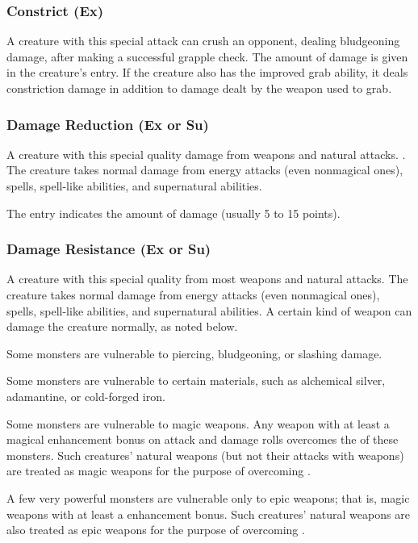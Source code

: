 \subsubsection{Constrict (Ex)} A creature with this special attack can crush an opponent, dealing bludgeoning damage, after making a successful grapple check. The amount of damage is given in the creature's entry. If the creature also has the improved grab ability, it deals constriction damage in addition to damage dealt by the weapon used to grab.

\subsubsection{Damage Reduction (Ex or Su)} A creature with this special quality  damage from weapons and natural attacks. . The creature takes normal damage from energy attacks (even nonmagical ones), spells, spell-like abilities, and supernatural abilities.

The entry indicates the amount of damage  (usually 5 to 15 points).


\subsubsection{Damage Resistance (Ex or Su)} A creature with this special quality  from most weapons and natural attacks. The creature takes normal damage from energy attacks (even nonmagical ones), spells, spell-like abilities, and supernatural abilities. A certain kind of weapon can  damage the creature normally, as noted below.

Some monsters are vulnerable to piercing, bludgeoning, or slashing damage.

Some monsters are vulnerable to certain materials, such as alchemical silver, adamantine, or cold-forged iron.

Some monsters are vulnerable to magic weapons. Any weapon with at least a  magical enhancement bonus on attack and damage rolls overcomes the  of these monsters. Such creatures' natural weapons (but not their attacks with weapons) are treated as magic weapons for the purpose of overcoming .

A few very powerful monsters are vulnerable only to epic weapons; that is, magic weapons with at least a  enhancement bonus. Such creatures' natural weapons are also treated as epic weapons for the purpose of overcoming .

